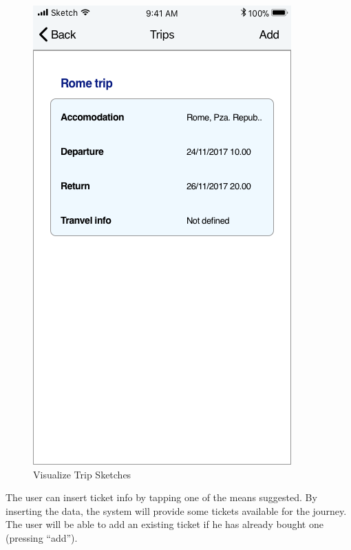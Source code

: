 \begin{figure}[H]
	\includegraphics[scale=0.23]{Images/Interface/Trips/6_trip_list}
	\caption{Visualize Trip Sketches}
\end{figure}
The user can insert ticket info by tapping one of the means suggested. By inserting the data, the system will provide some tickets available for the journey. The user will be able to add an existing ticket if he has already bought one (pressing “add”).
